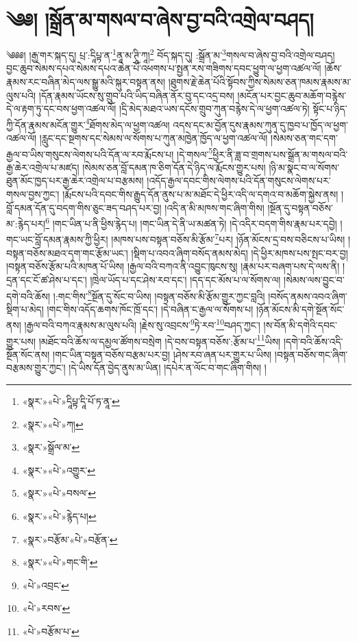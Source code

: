 \chapter{༄༅། །སྒྲོན་མ་གསལ་བ་ཞེས་བྱ་བའི་འགྲེལ་བཤད།}༄༅༅། །རྒྱ་གར་སྐད་དུ། པྲ་:དཱིཔྟ་ན་\footnote{«སྣར་»«པེ་»དཱིཔྟ་དཱི་པོ་ཏ་ནཱ་}ནཱ་མ་ཊཱི་ཀཱ།\footnote{«སྣར་»«པེ་»ཀ།} བོད་སྐད་དུ། :སྒྲོན་མ་\footnote{«སྣར་»སྒྲོལ་མ་}གསལ་བ་ཞེས་བྱ་བའི་འགྲེལ་བཤད། བྱང་ཆུབ་སེམས་དཔའ་སེམས་དཔའ་ཆེན་པོ་འཕགས་པ་སྤྱན་རས་གཟིགས་དབང་ཕྱུག་ལ་ཕྱག་འཚལ་ལོ། །ཆོས་རྣམས་རང་བཞིན་མེད་ལས་སྒྱུ་མའི་སྐུར་བསྟན་ནས། །ཐུགས་རྗེ་ཆེན་པོའི་སྟོབས་ཀྱིས་སེམས་ཅན་ཁམས་རྣམས་མ་ལུས་པའི། །དོན་རྣམས་ཡོངས་སུ་གྲུབ་པའི་ཡིད་བཞིན་ནོར་བུ་དང་འདྲ་བས། །མངོན་པར་བྱང་ཆུབ་མཆོག་བརྙེས་དེ་ལ་རྟག་ཏུ་དང་བས་ཕྱག་འཚལ་ལོ། །དྲི་མེད་མཐའ་ཡས་དངོས་གྲུབ་ཀུན་བརྙེས་དེ་ལ་ཕྱག་འཚལ་ཏེ། སྟོང་པ་ཉིད་ཀྱི་དོན་རྣམས་མངོན་གྱུར་\footnote{«སྣར་»«པེ་»འགྱུར་}ཐོགས་མེད་ལ་ཕྱག་འཚལ། འདས་དང་མ་བྱོན་དུས་རྣམས་ཀུན་དུ་ཁྱབ་པ་ཁྱོད་ལ་ཕྱག་འཚལ་ལོ། །རླུང་དང་སྔགས་དང་སེམས་ལ་སོགས་པ་ཀུན་མཁྱེན་ཁྱོད་ལ་ཕྱག་འཚལ་ལོ། །སེམས་ཅན་གང་དག་རྒྱལ་བ་ཡིས་གསུངས་ལེགས་པའི་དོན་ལ་རབ་རྨོངས་པ། །དེ་གསལ་\footnote{«སྣར་»«པེ་»བསལ་}ཕྱིར་ནི་ཟླ་བ་གྲགས་པས་སྒྲོན་མ་གསལ་བའི་རྒྱ་ཆེར་འགྲེལ་པ་མཛད། །སེམས་ཅན་བློ་དམན་ཁ་ཅིག་དོན་དེ་ཉིད་ལ་རྨོངས་གྱུར་པས། །ཉི་མ་སྣང་བ་ལ་སོགས་ཐུན་མོང་ཁྱད་པར་རྒྱ་ཆེར་འགྲེལ་པ་བརྩམས། །འདོད་རྒྱལ་དབང་གིས་ལེགས་པའི་དོན་གསུངས་ལེགས་པར་གསལ་བྱས་ཀྱང་། །རྨོངས་པའི་དབང་གིས་རྒྱུད་དོན་ནུས་པ་མ་མཐོང་དེ་ཕྱིར་འདི་ལ་དགའ་བ་མཆོག་སྐྱེས་ནས། །བློ་དམན་དོན་དུ་བདག་གིས་ཅུང་ཟད་བཤད་པར་བྱ། །འདི་ན་མི་མཁས་གང་ཞིག་གིས། །སྔོན་དུ་བསྟན་བཅོས་མ་:རྙེད་པར།\footnote{«སྣར་»«པེ་»རྙེད་པ།} །གང་ཡིན་པ་ནི་ཕྱིས་རྙེད་པ། །གང་ཡིན་དེ་ནི་ཡ་མཚན་ཏེ། །དེ་འདིར་བདག་གིས་རྣམ་པར་དབྱེ། །གང་ཡང་བློ་དམན་རྣམས་ཀྱི་ཕྱིར། །མཁས་པས་བསྟན་བཅོས་མི་རྩོམ་\footnote{«སྣར་»བརྩོམ་«པེ་»བརྩོན་}པར། །ཉོན་མོངས་དྲ་བས་བཅིངས་པ་ཡིས། །བསྟན་བཅོས་མཐའ་དག་གང་རྩོམ་ཡང་། །སྡིག་པ་འབའ་ཞིག་བསོད་ནམས་མེད། །དེ་ཕྱིར་མཁས་པས་སྤང་བར་བྱ། །བསྟན་བཅོས་རྩོམ་པའི་མཁན་པོ་ཡིས། །རྒྱལ་བའི་བཀའ་ནི་འབྱུང་ཁུངས་སུ། །རྣམ་པར་བཞག་པས་དེ་ལས་ནི། །དྲན་དང་ངོ་ཚ་ཤེས་པ་དང་། །ཁྲེལ་ཡོད་པ་དང་ཤེས་རབ་དང་། །དད་དང་མོས་པ་ལ་སོགས་ལ། །སེམས་ལས་བྱུང་བ་དགེ་བའི་ཆོས། །:གང་གིས་\footnote{«སྣར་»«པེ་»གང་གི་}སྔོན་དུ་སོང་བ་ཡིས། །བསྟན་བཅོས་མི་རྩོམ་གྱུར་ཀྱང་བླའི། །བསོད་ནམས་འབའ་ཞིག་སྡིག་པ་མེད། །གང་གིས་འདོད་ཆགས་ཁོང་ཁྲོ་དང་། །དེ་བཞིན་ང་རྒྱལ་ལ་སོགས་པ། །ཉོན་མོངས་མི་དགེ་སྔོན་སོང་ནས། །རྒྱལ་བའི་བཀའ་རྣམས་མ་ལུས་པའི། །རྗེས་སུ་འབྲངས་\footnote{«པེ་»འབྲང་}ཏེ་རབ་\footnote{«པེ་»རབས་}བཤད་ཀྱང་། །ས་བོན་མི་དགེའི་དབང་གྱུར་པས། །མཐོང་བའི་ཆོས་ལ་དམྱལ་ཚོགས་བསྲེག །དེ་བས་བསྟན་བཅོས་:རྩོམ་པ་\footnote{«པེ་»བརྩོམ་པ་}ཡིས། །དགེ་བའི་ཆོས་འདི་སྔོན་སོང་ནས། །གང་ཡིན་བསྟན་བཅོས་བརྩམ་པར་བྱ། །ཤེས་རབ་ཞན་པར་གྱུར་པ་ཡིས། །བསྟན་བཅོས་གང་ཞིག་བརྩམས་གྱུར་ཀྱང་། །དེ་ཡིས་དོན་བྱེད་ནུས་མ་ཡིན། །དཔེར་ན་ལོང་བ་གང་ཞིག་གིས། །

